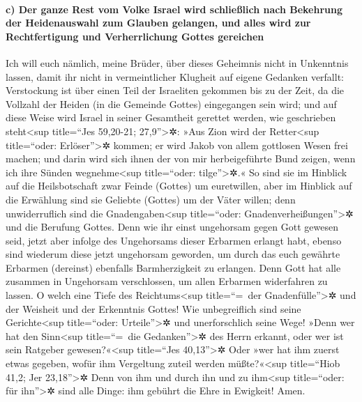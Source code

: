 \hypertarget{c-der-ganze-rest-vom-volke-israel-wird-schlieuxdflich-nach-bekehrung-der-heidenauswahl-zum-glauben-gelangen-und-alles-wird-zur-rechtfertigung-und-verherrlichung-gottes-gereichen}{%
\paragraph{c) Der ganze Rest vom Volke Israel wird schließlich nach
Bekehrung der Heidenauswahl zum Glauben gelangen, und alles wird zur
Rechtfertigung und Verherrlichung Gottes
gereichen}\label{c-der-ganze-rest-vom-volke-israel-wird-schlieuxdflich-nach-bekehrung-der-heidenauswahl-zum-glauben-gelangen-und-alles-wird-zur-rechtfertigung-und-verherrlichung-gottes-gereichen}}

 Ich will euch nämlich, meine Brüder, über dieses
Geheimnis nicht in Unkenntnis lassen, damit ihr nicht in vermeintlicher
Klugheit auf eigene Gedanken verfallt: Verstockung ist über einen Teil
der Israeliten gekommen bis zu der Zeit, da die Vollzahl der Heiden (in
die Gemeinde Gottes) eingegangen sein wird;  und auf
diese Weise wird Israel in seiner Gesamtheit gerettet werden, wie
geschrieben steht\textless sup title=``Jes 59,20-21;
27,9''\textgreater✲: »Aus Zion wird der Retter\textless sup
title=``oder: Erlöser''\textgreater✲ kommen; er wird Jakob von allem
gottlosen Wesen frei machen;  und darin wird sich ihnen
der von mir herbeigeführte Bund zeigen, wenn ich ihre Sünden
wegnehme\textless sup title=``oder: tilge''\textgreater✲.«
 So sind sie im Hinblick auf die Heilsbotschaft zwar
Feinde (Gottes) um euretwillen, aber im Hinblick auf die Erwählung sind
sie Geliebte (Gottes) um der Väter willen;  denn
unwiderruflich sind die Gnadengaben\textless sup title=``oder:
Gnadenverheißungen''\textgreater✲ und die Berufung Gottes.
 Denn wie ihr einst ungehorsam gegen Gott gewesen seid,
jetzt aber infolge des Ungehorsams dieser Erbarmen erlangt habt,
 ebenso sind wiederum diese jetzt ungehorsam geworden, um
durch das euch gewährte Erbarmen (dereinst) ebenfalls Barmherzigkeit zu
erlangen.  Denn Gott hat alle zusammen in Ungehorsam
verschlossen, um allen Erbarmen widerfahren zu lassen.  O
welch eine Tiefe des Reichtums\textless sup title=``=~der
Gnadenfülle''\textgreater✲ und der Weisheit und der Erkenntnis Gottes!
Wie unbegreiflich sind seine Gerichte\textless sup title=``oder:
Urteile''\textgreater✲ und unerforschlich seine Wege! 
»Denn wer hat den Sinn\textless sup title=``=~die
Gedanken''\textgreater✲ des Herrn erkannt, oder wer ist sein Ratgeber
gewesen?«\textless sup title=``Jes 40,13''\textgreater✲ 
Oder »wer hat ihm zuerst etwas gegeben, wofür ihm Vergeltung zuteil
werden müßte?«\textless sup title=``Hiob 41,2; Jer 23,18''\textgreater✲
 Denn von ihm und durch ihn und zu ihm\textless sup
title=``oder: für ihn''\textgreater✲ sind alle Dinge: ihm gebührt die
Ehre in Ewigkeit! Amen.

